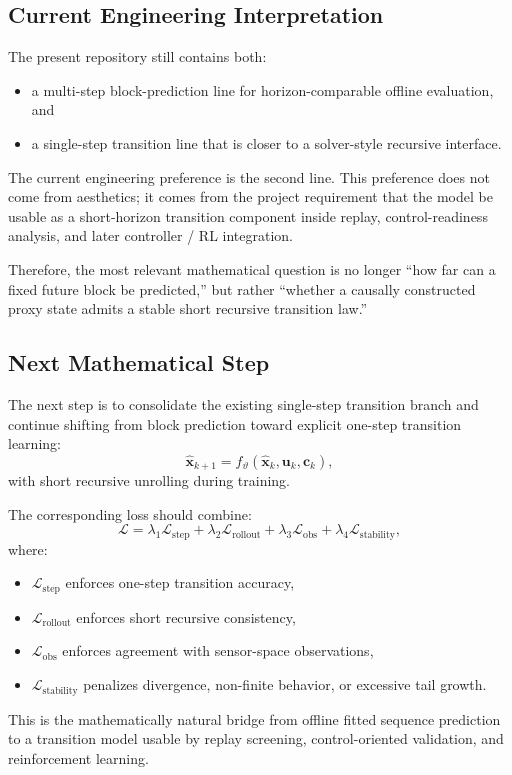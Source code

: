 \subsection{Current Engineering Interpretation}

The present repository still contains both:
\begin{itemize}
\item a multi-step block-prediction line for horizon-comparable offline evaluation, and
\item a single-step transition line that is closer to a solver-style recursive interface.
\end{itemize}

The current engineering preference is the second line.
This preference does not come from aesthetics; it comes from the project requirement that the model be usable as a short-horizon transition component inside replay, control-readiness analysis, and later controller / RL integration.

Therefore, the most relevant mathematical question is no longer
``how far can a fixed future block be predicted,'' but rather
``whether a causally constructed proxy state admits a stable short recursive transition law.''

\subsection{Next Mathematical Step}

The next step is to consolidate the existing single-step transition branch and continue shifting from block prediction toward explicit one-step transition learning:
\[
\hat{\mathbf{x}}_{k+1} = f_{\vartheta}(\hat{\mathbf{x}}_k, \mathbf{u}_k, \mathbf{c}_k),
\]
with short recursive unrolling during training.

The corresponding loss should combine:
\[
\mathcal{L}
=
\lambda_1 \mathcal{L}_{\text{step}}
+
\lambda_2 \mathcal{L}_{\text{rollout}}
+
\lambda_3 \mathcal{L}_{\text{obs}}
+
\lambda_4 \mathcal{L}_{\text{stability}},
\]
where:
\begin{itemize}
\item $\mathcal{L}_{\text{step}}$ enforces one-step transition accuracy,
\item $\mathcal{L}_{\text{rollout}}$ enforces short recursive consistency,
\item $\mathcal{L}_{\text{obs}}$ enforces agreement with sensor-space observations,
\item $\mathcal{L}_{\text{stability}}$ penalizes divergence, non-finite behavior, or excessive tail growth.
\end{itemize}

This is the mathematically natural bridge from offline fitted sequence prediction
to a transition model usable by replay screening, control-oriented validation, and reinforcement learning.
